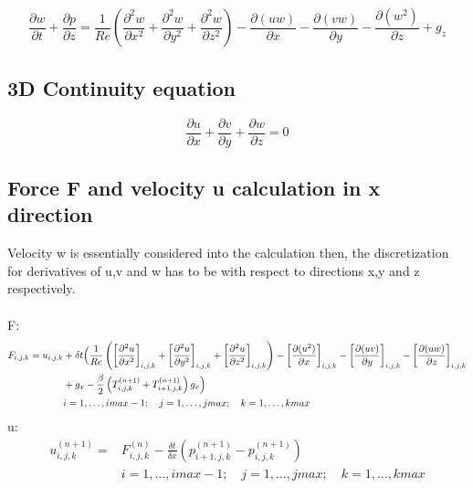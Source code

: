 \documentclass{article}%
\begin{document}
\begin{equation}
\frac{\partial w}{\partial t} + \frac{\partial p}{\partial z} = 
\frac{1}{Re} \left( \frac{\partial^2 w}{\partial x^2} + \frac{\partial^2 w}{\partial y^2} + \frac{\partial^2 w}{\partial z^2} \right) - 
\frac{\partial(uw)}{\partial x} -\frac{\partial (vw)}{\partial y} - 
\frac{\partial (w^2)}{\partial z} +
g_z
\end{equation}

\subsection{3D Continuity equation}
\begin{equation}
\frac{\partial u}{\partial x} + \frac{\partial v}{\partial y} + \frac{\partial w}{\partial z} = 0
\end{equation}

\subsection{Force F and velocity u calculation in x direction}
Velocity w is essentially considered into the calculation then, the discretization for derivatives of u,v and w has to be with respect to directions x,y and z respectively.\\
\\
F:
\begin{equation}
\begin{split}
F_{i,j,k} =
u_{i,j,k} & + \delta t \Bigl(
\frac{1}{Re} \left( \left[\frac{\partial^2 u}{\partial x^2}\right]_{i,j,k} + \left[\frac{\partial^2 u}{\partial y^2}\right]_{i,j,k} + \left[\frac{\partial^2 u}{\partial z^2}\right]_{i,j,k} \right) - 
\left[\frac{\partial(u^2)}{\partial x}\right]_{i,j,k} -\left[\frac{\partial (uv)}{\partial y}\right]_{i,j,k} - 
\left[\frac{\partial (uw)}{\partial z}\right]_{i,j,k}\\
& + {g_x} - \frac{\beta}{2} \left( T^{(n+1)}_{i,j,k} + T^{(n+1)}_{i+1,j,k} \right) g_x \Bigr)\\
& i = 1,\ldots,imax-1; \quad j = 1,\ldots,jmax; \quad k = 1,\ldots,kmax
\end{split}
\end{equation}
u:\\
\begin{equation}
\begin{split}
u^{(n+1)}_{i,j,k} = & F^{(n)}_{i,j,k} - \frac{\delta t}{\delta x}\left(p^{(n+1)}_{i+1,j,k} - p^{(n+1)}_{i,j,k}\right)\\
& i = 1,\ldots,imax-1; \quad j = 1,\ldots,jmax; \quad k = 1,\ldots,kmax
\end{split}
\end{equation}
\end{document}
